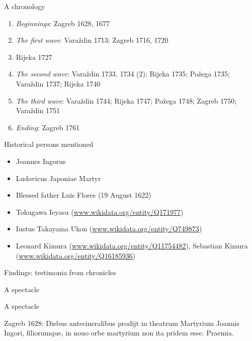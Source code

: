 \documentclass[14pt]{beamer}
\begin{document}
\begin{frame}{A chronology}

\begin{enumerate}
\item \emph{Beginnings}: Zagreb 1628, 1677
\item \emph{The first wave}: Varaždin 1713; Zagreb 1716, 1720
\item Rijeka 1727
\item \emph{The second wave}: Varaždin 1733, 1734 (2); Rijeka 1735; Požega 1735; Varaždin 1737; Rijeka 1740
\item \emph{The third wave}: Varaždin 1744; Rijeka 1747; Požega 1748; Zagreb 1750; Varaždin 1751
\item \emph{Ending}: Zagreb 1761
\end{enumerate}

\end{frame}

\begin{frame}{Historical persons mentioned}

\begin{itemize}
\item Joannes Ingorus
\item Ludovicus Japoniae Martyr
\item Blessed father Luis Flores (19 August 1622)
\item Tokugawa Ieyasu (\href{http://www.wikidata.org/entity/Q171977}{www.wikidata.org/entity/Q171977})
\item Iustus Takayama Ukon (\href{http://www.wikidata.org/entity/Q749873}{www.wikidata.org/entity/Q749873})
\item Leonard Kimura (\href{http://www.wikidata.org/entity/Q11754482}{www.wikidata.org/entity/Q11754482}), Sebastian Kimura (\href{https://www.wikidata.org/entity/Q16185936}{www.wikidata.org/entity/Q16185936})
\end{itemize}

\end{frame}

\begin{frame}{Findings: testimonia from chronicles}

A spectacle


\end{frame}

\begin{frame}{A spectacle}

\alert{Zagreb 1628}: Diebus antecineralibus prodijt in theatrum Martyrium Joannis Ingori, filiorumque, in nouo orbe martyrium non ita pridem esse. Praemia.

\end{frame}
\end{document}
